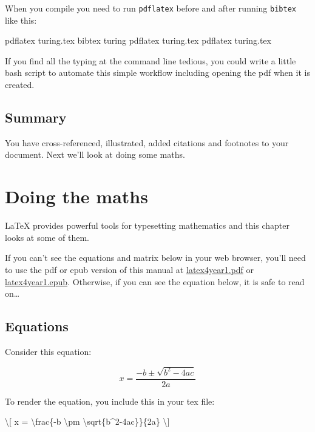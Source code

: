 \documentclass[
]{book}
\newenvironment{Shaded}{\begin{snugshade}}{\end{snugshade}}
\newcommand{\NormalTok}[1]{#1}
\newcommand{\SpecialCharTok}[1]{\textcolor[rgb]{0.00,0.00,0.00}{#1}}
\newcommand{\SpecialStringTok}[1]{\textcolor[rgb]{0.31,0.60,0.02}{#1}}
\begin{document}
When you compile you need to run \texttt{pdflatex} before and after running \texttt{bibtex} like this:

\begin{Shaded}
\begin{Highlighting}[]
\NormalTok{pdflatex turing.tex}
\NormalTok{bibtex turing}
\NormalTok{pdflatex turing.tex}
\NormalTok{pdflatex turing.tex}
\end{Highlighting}
\end{Shaded}

If you find all the typing at the command line tedious, you could write a little bash script to automate this simple workflow including opening the pdf when it is created.

\hypertarget{fingconc}{%
\section{Summary}\label{fingconc}}

You have cross-referenced, illustrated, added citations and footnotes to your document. Next we'll look at doing some maths.

\hypertarget{maths}{%
\chapter{Doing the maths}\label{maths}}

LaTeX provides powerful tools for typesetting mathematics and this chapter looks at some of them.

If you can't see the equations and matrix below in your web browser, you'll need to use the pdf or epub version of this manual at \href{https://latex4year1.netlify.app/latex4year1.pdf}{latex4year1.pdf} or \href{https://latex4year1.netlify.app/latex4year1.epub}{latex4year1.epub}. Otherwise, if you can see the equation below, it is safe to read on\ldots{}

\hypertarget{equations}{%
\section{Equations}\label{equations}}

Consider this equation:

\[ x = \frac{-b \pm \sqrt{b^2-4ac}}{2a} \]

To render the equation, you include this in your tex file:

\begin{Shaded}
\begin{Highlighting}[]
     \SpecialStringTok{\textbackslash{}[ x = }\SpecialCharTok{\textbackslash{}frac}\SpecialStringTok{\{{-}b }\SpecialCharTok{\textbackslash{}pm}\SpecialStringTok{ }\SpecialCharTok{\textbackslash{}sqrt}\SpecialStringTok{\{b\^{}2{-}4ac\}\}\{2a\} \textbackslash{}]}
\end{Highlighting}
\end{Shaded}
\end{document}
